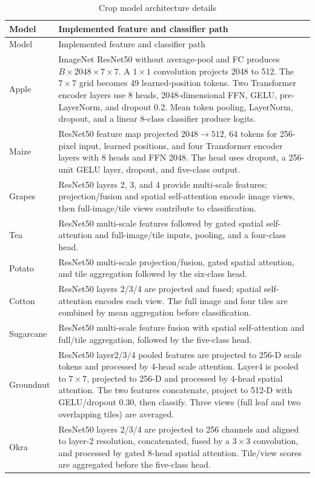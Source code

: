 \documentclass[12pt,a4paper,oneside]{report}
\begin{document}
\begin{longtable}{p{1.2cm}p{13.5cm}}\caption{Crop model architecture details}\label{tab:architecture}\\\toprule Model & Implemented feature and classifier path\\\midrule\endfirsthead\toprule Model & Implemented feature and classifier path\\\midrule\endhead
Apple&ImageNet ResNet50 without average-pool and FC produces $B\times2048\times7\times7$. A $1\times1$ convolution projects 2048 to 512. The $7\times7$ grid becomes 49 learned-position tokens. Two Transformer encoder layers use 8 heads, 2048-dimensional FFN, GELU, pre-LayerNorm, and dropout 0.2. Mean token pooling, LayerNorm, dropout, and a linear 8-class classifier produce logits.\\
Maize&ResNet50 feature map projected $2048\to512$, 64 tokens for 256-pixel input, learned positions, and four Transformer encoder layers with 8 heads and FFN 2048. The head uses dropout, a 256-unit GELU layer, dropout, and five-class output.\\
Grapes&ResNet50 layers 2, 3, and 4 provide multi-scale features; projection/fusion and spatial self-attention encode image views, then full-image/tile views contribute to classification.\\
Tea&ResNet50 multi-scale features followed by gated spatial self-attention and full-image/tile inputs, pooling, and a four-class head.\\
Potato&ResNet50 multi-scale projection/fusion, gated spatial attention, and tile aggregation followed by the six-class head.\\
Cotton&ResNet50 layers 2/3/4 are projected and fused; spatial self-attention encodes each view. The full image and four tiles are combined by mean aggregation before classification.\\
Sugarcane&ResNet50 multi-scale feature fusion with spatial self-attention and full/tile aggregation, followed by the five-class head.\\
Groundnut&ResNet50 layer2/3/4 pooled features are projected to 256-D scale tokens and processed by 4-head scale attention. Layer4 is pooled to $7\times7$, projected to 256-D and processed by 4-head spatial attention. The two features concatenate, project to 512-D with GELU/dropout 0.30, then classify. Three views (full leaf and two overlapping tiles) are averaged.\\
Okra&ResNet50 layers 2/3/4 are projected to 256 channels and aligned to layer-2 resolution, concatenated, fused by a $3\times3$ convolution, and processed by gated 8-head spatial attention. Tile/view scores are aggregated before the five-class head.\\\bottomrule\end{longtable}
\end{document}

